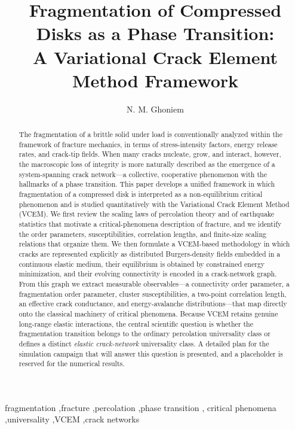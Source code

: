 \documentclass[preprint,12pt]{elsarticle}
\begin{document}
\begin{frontmatter}

\title{Fragmentation of Compressed Disks as a Phase Transition:\\
A Variational Crack Element Method Framework}

\author{N. M. Ghoniem}
\address{Department of Mechanical and Aerospace Engineering,
University of California, Los Angeles, CA 90095, USA}

\begin{abstract}
The fragmentation of a brittle solid under load is conventionally analyzed within
the framework of fracture mechanics, in terms of stress-intensity factors, energy
release rates, and crack-tip fields. When many cracks nucleate, grow, and interact,
however, the macroscopic loss of integrity is more naturally described as the
emergence of a system-spanning crack network---a collective, cooperative phenomenon
with the hallmarks of a phase transition. This paper develops a unified framework
in which fragmentation of a compressed disk is interpreted as a non-equilibrium
critical phenomenon and is studied quantitatively with the Variational Crack Element
Method (VCEM). We first review the scaling laws of percolation theory and of
earthquake statistics that motivate a critical-phenomena description of fracture,
and we identify the order parameters, susceptibilities, correlation lengths, and
finite-size scaling relations that organize them. We then formulate a VCEM-based
methodology in which cracks are represented explicitly as distributed Burgers-density
fields embedded in a continuous elastic medium, their equilibrium is obtained by
constrained energy minimization, and their evolving connectivity is encoded in a
crack-network graph. From this graph we extract measurable observables---a
connectivity order parameter, a fragmentation order parameter, cluster
susceptibilities, a two-point correlation length, an effective crack conductance,
and energy-avalanche distributions---that map directly onto the classical machinery
of critical phenomena. Because VCEM retains genuine long-range elastic interactions,
the central scientific question is whether the fragmentation transition belongs to
the ordinary percolation universality class or defines a distinct
\emph{elastic crack-network} universality class. A detailed plan for the simulation
campaign that will answer this question is presented, and a placeholder is reserved
for the numerical results.
\end{abstract}

\begin{keyword}
fragmentation \sep fracture \sep percolation \sep phase transition \sep
critical phenomena \sep universality \sep VCEM \sep crack networks
\end{keyword}

\end{frontmatter}
\end{document}

